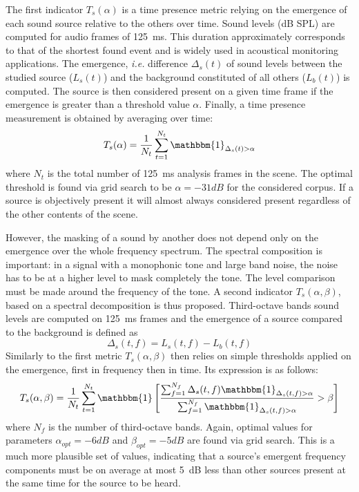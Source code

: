 \documentclass{article}
\begin{document}
\begin{sloppy}
The first indicator $T_s(\alpha)$ is a time presence metric relying on the emergence of each sound source relative to the others over time. Sound levels (dB SPL) are computed for audio frames of 125~ms. This duration approximately corresponds to that of the shortest found event and is widely used in acoustical monitoring applications. The emergence, \textit{i.e.} difference $\Delta_s(t)$ of sound levels between the studied source ($L_s(t)$) and the background constituted of all others ($L_b(t)$) is computed. The source is then considered present on a given time frame if the emergence is greater than a threshold value $\alpha$. Finally, a time presence measurement is obtained by averaging over time:
\begin{equation}
T_s(\alpha) = \frac{1}{N_t}\sum_{t = 1}^{N_t}\mathbbm{1}_{\Delta_s(t)>\alpha}
\end{equation}
where $N_t$ is the total number of 125~ms analysis frames in the scene. The optimal threshold is found via grid search to be $\alpha = -31dB$ for the considered corpus. If a source is objectively present it will almost always considered present regardless of the other contents of the scene.

However, the masking of a sound by another does not depend only on the emergence over the whole frequency spectrum. The spectral composition is important: in a signal with a monophonic tone and large band noise, the noise has to be at a higher level to mask completely the tone. The level comparison must be made around the frequency of the tone. A second indicator $T_s(\alpha, \beta)$, based on a spectral decomposition is thus proposed. Third-octave bands sound levels are computed on 125~ms frames and the emergence of a source compared to the background is defined as
\begin{equation}
\Delta_s(t, f) = L_s(t, f) - L_b(t, f)
\end{equation}
Similarly to the first metric $T_s(\alpha, \beta)$ then relies on simple thresholds applied on the emergence, first in frequency then in time. Its expression is as follows:
\begin{equation}
T_s(\alpha, \beta) = \frac{1}{N_t}\sum_{t = 1}^{N_t}\mathbbm{1}\left[ \frac{\sum_{f = 1}^{N_f}\Delta_s(t, f)\mathbbm{1}_{\Delta_s(t, f)>\alpha}}{\sum_{f = 1}^{N_f}\mathbbm{1}_{\Delta_s(t, f)>\alpha}}>\beta \right]
\end{equation}
where $N_f$ is the number of third-octave bands. Again, optimal values for parameters $\alpha_{opt} = -6 dB$ and $\beta_{opt} = -5 dB$ are found via grid search. This is a much more plausible set of values, indicating that a source's emergent frequency components must be on average at most 5~dB less than other sources present at the same time for the source to be heard.


\end{sloppy}
\end{document}
